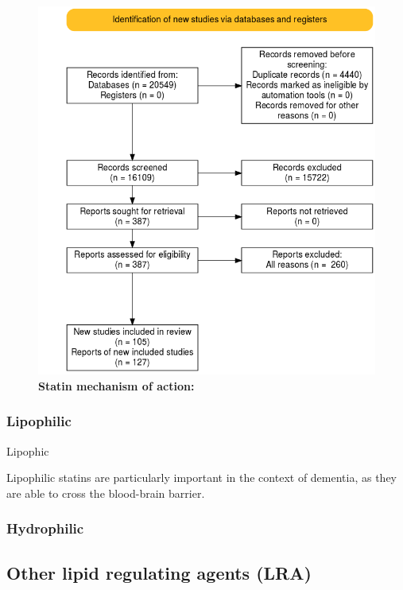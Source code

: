 \documentclass[a4paper,nobind]{templates/ociamthesis}
\begin{document}
\begin{figure}
\includegraphics[width=1\linewidth]{figures/sys-rev/prisma_flow} \caption[Statin mechanism of action]{\textbf{Statin mechanism of action:}}\label{fig:statin-mechanisam}
\end{figure}

\hypertarget{lipophilic}{%
\subsubsection{Lipophilic}\label{lipophilic}}

Lipophic

Lipophilic statins are particularly important in the context of dementia, as they are able to cross the blood-brain barrier.

\hypertarget{hydrophilic}{%
\subsubsection{Hydrophilic}\label{hydrophilic}}

\hypertarget{other-lipid-regulating-agents-lra}{%
\subsection{Other lipid regulating agents (LRA)}\label{other-lipid-regulating-agents-lra}}
\end{document}
